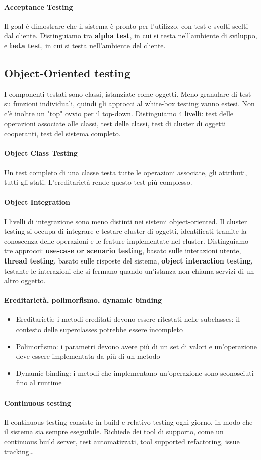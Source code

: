 \documentclass[11pt]{article}
\begin{document}
\paragraph{Acceptance Testing} Il goal è dimostrare che il sistema è pronto per l'utilizzo, con test e svolti scelti dal cliente. Distinguiamo tra \textbf{alpha test}, in cui si testa nell'ambiente di sviluppo, e \textbf{beta test}, in cui si testa nell'ambiente del cliente.
\subsection{Object-Oriented testing}
I componenti testati sono classi, istanziate come oggetti. Meno granulare di test su funzioni individuali, quindi gli approcci al white-box testing vanno estesi. Non c'è inoltre un "top" ovvio per il top-down. Distinguiamo 4 livelli: test delle operazioni associate alle classi, test delle classi, test di cluster di oggetti cooperanti, test del sistema completo. 
\paragraph{Object Class Testing} Un test completo di una classe testa tutte le operazioni associate, gli attributi, tutti gli stati. L'ereditarietà rende questo test più complesso.
\paragraph{Object Integration}
I livelli di integrazione sono meno distinti nei sistemi object-oriented. Il cluster testing si occupa di integrare e testare cluster di oggetti, identificati tramite la conoscenza delle operazioni e le feature implementate nel cluster. Distinguiamo tre approcci: \textbf{use-case or scenario testing}, basato sulle interazioni utente, \textbf{thread testing}, basato sulle risposte del sistema, \textbf{object interaction testing}, testante le interazioni che si fermano quando un'istanza non chiama servizi di un altro oggetto. 
\paragraph{Ereditarietà, polimorfismo, dynamic binding}
\begin{itemize}
    \item Ereditarietà: i metodi ereditati devono essere ritestati nelle subclasses: il contesto delle superclasses potrebbe essere incompleto 
    \item Polimorfismo: i parametri devono avere più di un set di valori e un'operazione deve essere implementata da più di un metodo 
    \item Dynamic binding: i metodi che implementano un'operazione sono sconosciuti fino al runtime 
\end{itemize}
\paragraph{Continuous testing}
Il continuous testing consiste in build e relativo testing ogni giorno, in modo che il sistema sia sempre eseguibile. Richiede dei tool di supporto, come un continuous build server, test automatizzati, tool supported refactoring, issue tracking\dots
\printglossary
\end{document}
